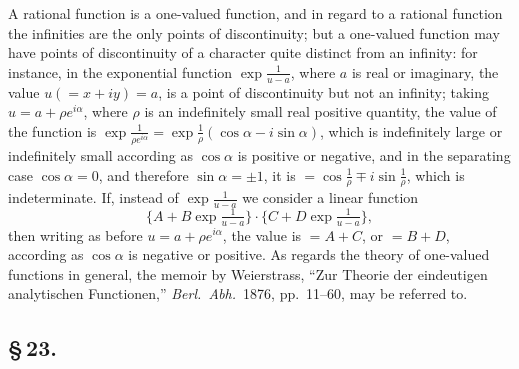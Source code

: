 \documentclass[11pt,a4paper]{article}
\begin{document}
A rational function is a one-valued function, and in regard to a rational function the infinities are the only points of discontinuity; but a one-valued function may have points of discontinuity of a character quite distinct from an infinity: for instance, in the exponential function $\exp\frac{1}{u - a}$, where $a$ is real or imaginary, the value $u (= x + iy) = a$, is a point of discontinuity but not an infinity; taking $u = a + \rho e^{i\alpha}$, where $\rho$ is an indefinitely small real positive quantity, the value of the function is $\exp\frac{1}{\rho e^{i\alpha}} = \exp\frac{1}{\rho}(\cos\alpha - i\sin\alpha)$, which is indefinitely large or indefinitely small according as $\cos\alpha$ is positive or negative, and in the separating case $\cos\alpha = 0$, and therefore $\sin\alpha = \pm 1$, it is $= \cos\frac{1}{\rho} \mp i\sin\frac{1}{\rho}$, which is indeterminate. If, instead of $\exp\frac{1}{u - a}$ we consider a linear function
\[
\{A + B\exp\tfrac{1}{u - a}\} \cdot \{C + D\exp\tfrac{1}{u - a}\},
\]
then writing as before $u = a + \rho e^{i\alpha}$, the value is $= A + C$, or $= B + D$, according as $\cos\alpha$ is negative or positive. As regards the theory of one-valued functions in general, the memoir by Weierstrass, ``Zur Theorie der eindeutigen analytischen Functionen,'' \textit{Berl.\ Abh.}\ 1876, pp.~11--60, may be referred to.

\subsection*{\S\,23.}
\end{document}
